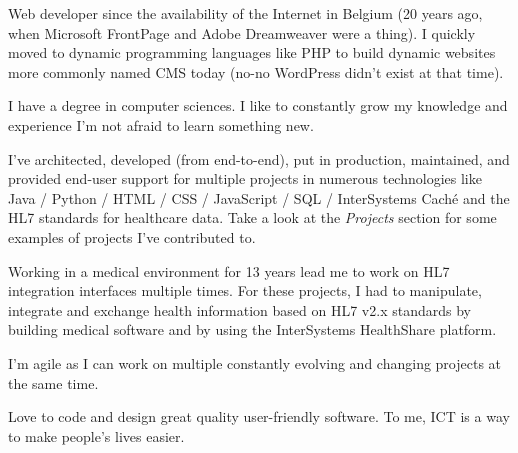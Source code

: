 

\begin{cvparagraph}

Web developer since the availability of the Internet in Belgium (20 years ago, when Microsoft FrontPage and Adobe Dreamweaver were a thing). I quickly moved to dynamic programming languages like PHP to build dynamic websites more commonly named CMS today (no-no WordPress didn't exist at that time).

I have a degree in computer sciences. I like to constantly grow my knowledge and experience \Rightarrow  I'm not afraid to learn something new. 

I've architected, developed (from end-to-end), put in production, maintained, and provided end-user support for multiple projects in numerous technologies like Java / Python / HTML / CSS / JavaScript / SQL / InterSystems Caché and the HL7 standards for healthcare data. Take a look at the \emph{Projects} section for some examples of projects I've contributed to.

Working in a medical environment for 13 years lead me to work on HL7 integration interfaces multiple times. For these projects, I had to manipulate, integrate and exchange health information based on HL7 v2.x standards by building medical software and by using the InterSystems HealthShare platform.

I'm agile as I can work on multiple constantly evolving and changing projects at the same time.

Love to code and design great quality user-friendly software.
To me, ICT is a way to make people's lives easier.
\end{cvparagraph}
